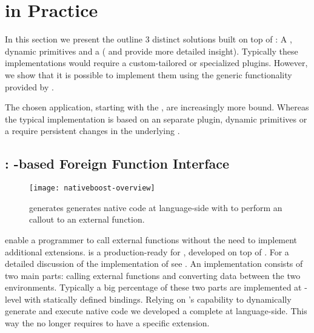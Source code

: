 \section{\B in Practice}
In this section we present the outline 3 distinct solutions built on top of \B: A \FFI, dynamic primitives and a \JIT ( and  provide more detailed insight).
Typically these implementations would require a custom-tailored \VM or specialized plugins.
However, we show that it is possible to implement them using the generic functionality provided by \B.

The chosen application, starting with the \FFI, are increasingly more \VM bound.
Whereas the typical \FFI implementation is based on an separate plugin, dynamic primitives or a \JIT require persistent changes in the underlying \VM.


\subsection{\NB: \B-based Foreign Function Interface}

\begin{figure}[h]
	\centering
	\texttt{[image: nativeboost-overview]}
	\caption[\NB Overview]{\NB generates generates native code at language-side with \B to perform an \FFI callout to an external function.}
\end{figure}

\noindent \FFIs enable a programmer to call external functions without the need to implement additional \VM extensions.
\NB \cite{Brun13a} is a production-ready \FFI for \PH, developed on top of \B. 
For a detailed discussion of the implementation of \NB see .
An \FFI implementation consists of two main parts: calling external functions and converting data between the two environments.
Typically a big percentage of these two parts are implemented at \VM-level with statically defined bindings.
Relying on \B's capability to dynamically generate and execute native code we developed a complete \FFI at language-side.
This way the \VM no longer requires to have a specific \FFI extension.

